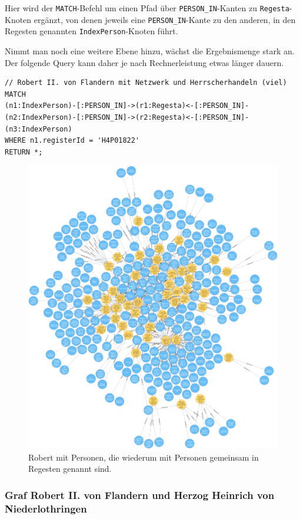 \documentclass[ngerman,]{scrreprt}
\begin{document}
Hier wird der \texttt{MATCH}-Befehl um einen Pfad über \texttt{PERSON\_IN}-Kanten zu \texttt{Regesta}-Knoten ergänzt, von denen jeweils eine \texttt{PERSON\_IN}-Kante zu den anderen, in den Regesten genannten \texttt{IndexPerson}-Knoten führt.

Nimmt man noch eine weitere Ebene hinzu, wächst die Ergebnismenge stark an. Der folgende Query kann daher je nach Rechnerleistung etwas länger dauern.

\begin{verbatim}
// Robert II. von Flandern mit Netzwerk und Herrscherhandeln (viel)
MATCH
(n1:IndexPerson)-[:PERSON_IN]->(r1:Regesta)<-[:PERSON_IN]-
(n2:IndexPerson)-[:PERSON_IN]->(r2:Regesta)<-[:PERSON_IN]-
(n3:IndexPerson)
WHERE n1.registerId = 'H4P01822'
RETURN *;
\end{verbatim}

\begin{figure}
\centering
\includegraphics{Bilder/RI2Graph/Robert-viel.png}
\caption{Robert mit Personen, die wiederum mit Personen gemeinsam in Regesten genannt sind.}
\end{figure}

\hypertarget{graf-robert-ii.-von-flandern-und-herzog-heinrich-von-niederlothringen}{%
\subsubsection{Graf Robert II. von Flandern und Herzog Heinrich von Niederlothringen}\label{graf-robert-ii.-von-flandern-und-herzog-heinrich-von-niederlothringen}}
\end{document}
